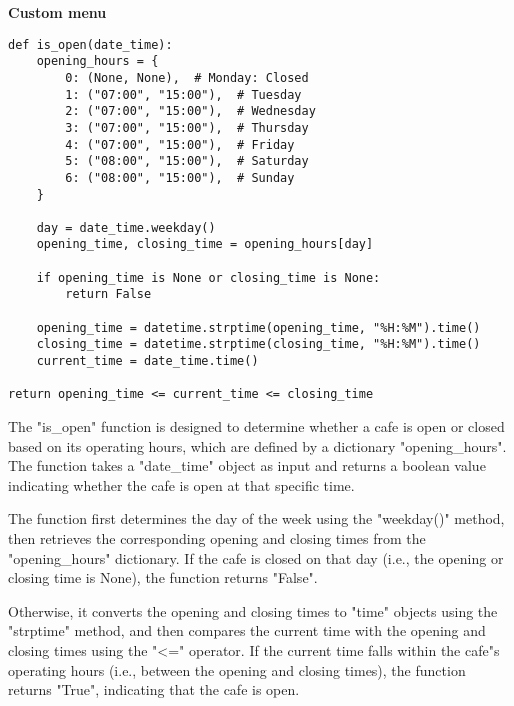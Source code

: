 	\textbf{Custom menu}
	
	\begin{lstlisting}
def is_open(date_time):
	opening_hours = {
		0: (None, None),  # Monday: Closed
		1: ("07:00", "15:00"),  # Tuesday
		2: ("07:00", "15:00"),  # Wednesday
		3: ("07:00", "15:00"),  # Thursday
		4: ("07:00", "15:00"),  # Friday
		5: ("08:00", "15:00"),  # Saturday
		6: ("08:00", "15:00"),  # Sunday
	}
	
	day = date_time.weekday()
	opening_time, closing_time = opening_hours[day]
	
	if opening_time is None or closing_time is None:
		return False
	
	opening_time = datetime.strptime(opening_time, "%H:%M").time()
	closing_time = datetime.strptime(closing_time, "%H:%M").time()
	current_time = date_time.time()

return opening_time <= current_time <= closing_time
	\end{lstlisting}
	
	The "is{\_}open" function is designed to determine whether a cafe is open or closed based on its operating hours, which are defined by a dictionary "opening{\_}hours". The function takes a "date{\_}time" object as input and returns a boolean value indicating whether the cafe is open at that specific time.
	
	The function first determines the day of the week using the "weekday()" method, then retrieves the corresponding opening and closing times from the "opening{\_}hours" dictionary. If the cafe is closed on that day (i.e., the opening or closing time is None), the function returns "False".
	
	Otherwise, it converts the opening and closing times to "time" objects using the "strptime" method, and then compares the current time with the opening and closing times using the "<=" operator. If the current time falls within the cafe"s operating hours (i.e., between the opening and closing times), the function returns "True", indicating that the cafe is open.
	

